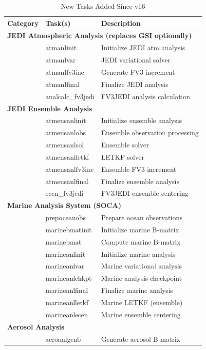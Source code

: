 \documentclass[11pt,letterpaper]{article}
\begin{document}
\begin{table}[H]
\centering
\caption{New Tasks Added Since v16}
\small
\begin{tabular}{@{}llp{8cm}@{}}
\toprule
\textbf{Category} & \textbf{Task(s)} & \textbf{Description} \\
\midrule
\multicolumn{3}{l}{\textbf{JEDI Atmospheric Analysis (replaces GSI optionally)}} \\
& atmanlinit & Initialize JEDI atm analysis \\
& atmanlvar & JEDI variational solver \\
& atmanlfv3inc & Generate FV3 increment \\
& atmanlfinal & Finalize JEDI analysis \\
& analcalc\_fv3jedi & FV3JEDI analysis calculation \\
\midrule
\multicolumn{3}{l}{\textbf{JEDI Ensemble Analysis}} \\
& atmensanlinit & Initialize ensemble analysis \\
& atmensanlobs & Ensemble observation processing \\
& atmensanlsol & Ensemble solver \\
& atmensanlletkf & LETKF solver \\
& atmensanlfv3inc & Ensemble FV3 increment \\
& atmensanlfinal & Finalize ensemble analysis \\
& ecen\_fv3jedi & FV3JEDI ensemble centering \\
\midrule
\multicolumn{3}{l}{\textbf{Marine Analysis System (SOCA)}} \\
& prepoceanobs & Prepare ocean observations \\
& marinebmatinit & Initialize marine B-matrix \\
& marinebmat & Compute marine B-matrix \\
& marineanlinit & Initialize marine analysis \\
& marineanlvar & Marine variational analysis \\
& marineanlchkpt & Marine analysis checkpoint \\
& marineanlfinal & Finalize marine analysis \\
& marineanlletkf & Marine LETKF (ensemble) \\
& marineanlecen & Marine ensemble centering \\
\midrule
\multicolumn{3}{l}{\textbf{Aerosol Analysis}} \\
& aeroanlgenb & Generate aerosol B-matrix \\

\end{tabular}
\end{table}
\end{document}
